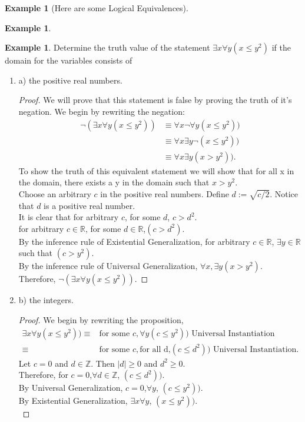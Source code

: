 \documentclass[letterpaper,10pt]{article}
\theoremstyle{plain}
\theoremstyle{definition}
\newtheorem{exmp}[thm]{Example}
\theoremstyle{remark}
\providecommand{\abs}[1]{\ensuremath{\left\lvert#1\right\rvert}}
\begin{document}
\begin{exmp}[Here are some Logical Equivalences]
\begin{exmp}
\end{exmp}


\begin{exmp}
Determine the truth value of the statement $\exists x \forall y (x\leq y^2)$
if the domain for the variables consists of
\newline
\begin{enumerate}
\item a) the positive real numbers.
\vspace{3cm}
\begin{proof}
We will prove that this statement is false by proving the truth of it's negation.
We begin by rewriting the negation:
\begin{align}
\lnot(\exists x \forall y (x\leq y^2))&\equiv \forall x \lnot \forall y (x\leq y^2))\\
&\equiv \forall x  \exists y \lnot  (x\leq y^2))\\
&\equiv \forall x  \exists y (x > y^2)).
\end{align}
To show the truth of this equivalent statement we will show that for all x in the domain, there exists a y in the domain such that $x>y^2$.
\\
Choose an arbitrary $c$ in the positive real numbers. Define $d:=\sqrt{c/2}$. Notice that $d$ is a positive real number.
\\
It is clear that for arbitrary $c$, for some $d$, $c>d^2$.\\
 for arbitrary $c\in \mathbb{R}$, for some $d\in \mathbb{R}$,$(c > d^2) $.\\
By the inference rule of Existential Generalization,
for arbitrary $c\in \mathbb{R}$, $\exists y \in \mathbb{R}$ such that $(c > y^2) $.\\
By the inference rule of Universal Generalization,
$\forall x, \exists y (x > y^2)$.\\
Therefore, $\lnot(\exists x \forall y (x\leq y^2))$.
\end{proof}
\newpage 
\item b) the integers.
\vspace{3cm}
\begin{proof}
We begin by rewriting the proposition,
\begin{align}
\exists x \forall y (x\leq y^2))\equiv& \text{for some } c,\forall y (c\leq y^2))\text{ Universal Instantiation}\\
\equiv& \text{for some } c,\text{for all d,} (c\leq d^2))\text{ Universal Instantiation}.
\end{align}
Let $c=0$ and $d\in \mathbb{Z}$. Then $\abs{d}\geq 0$ and $d^2\geq 0$.\\
Therefore, for $c=0$,$\forall d\in \mathbb{Z}$, $ (c\leq d^2))$.\\
By Universal Generalization, $c=0$,$\forall y$, $ (c\leq y^2))$.\\
By Existential Generalization, $\exists x$$\forall y$, $ (x\leq y^2))$.\\


\end{proof}
\end{enumerate}
\end{exmp}
\end{exmp}
\end{document}
